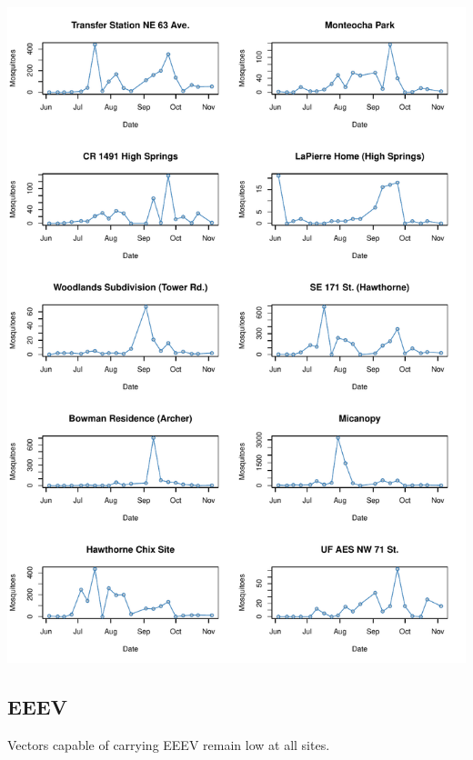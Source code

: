 \documentclass{article}
\begin{document}
\begin{center}
\includegraphics{mosq04nov13-009}

\newpage
\subsection*{EEEV}

\end{center}

Vectors capable of carrying EEEV remain low at all sites.\\
\end{document}
